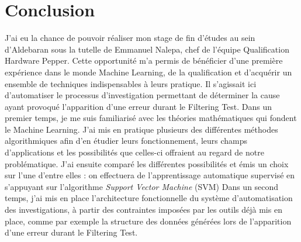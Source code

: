 \chapter{Conclusion}
\label{Conclusion}
\thispagestyle{fancy}

J'ai eu la chance de pouvoir réaliser mon stage de fin d'études au sein d'Aldebaran sous la tutelle de Emmanuel Nalepa, chef de l'équipe Qualification Hardware Pepper. Cette opportunité m'a permis de bénéficier d'une première expérience dans le monde Machine Learning, de la qualification et d'acquérir un ensemble de techniques indispensables à leurs pratique. Il s'agissait ici d'automatiser le processus d'investigation permettant de déterminer la cause ayant provoqué l'apparition d'une erreur durant le Filtering Test.
\newline
\newline
Dans un premier temps, je me suis familiarisé avec les théories mathématiques qui fondent le Machine Learning. J'ai mis en pratique plusieurs des différentes méthodes algorithmiques afin d'en étudier leurs fonctionnement, leurs champs d'applications et les possibilités que celles-ci offraient au regard de notre problématique. J'ai ensuite comparé les différentes possibilités et émis un choix sur l'une d'entre elles : on effectuera de l'apprentissage automatique supervisé en s'appuyant sur l'algorithme \emph{Support Vector Machine} (SVM)
\newline
\newline
Dans un second temps, j'ai mis en place l'architecture fonctionnelle du système d'automatisation des investigations, à partir des contraintes imposées par les outils déjà mis en place, comme par exemple la structure des données générées lors de l'apparition d'une erreur durant le Filtering Test. 